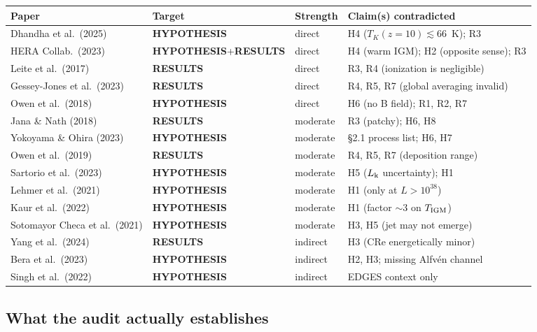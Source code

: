 \documentclass[11pt,a4paper]{article}
\newcommand{\HYP}{\textcolor{blue!60!black}{\textbf{HYPOTHESIS}}}
\newcommand{\RES}{\textcolor{red!60!black}{\textbf{RESULTS}}}
\begin{document}
\begin{longtable}{@{}p{4.6cm}p{1.9cm}p{2.0cm}p{5.6cm}@{}}
\toprule
\textbf{Paper} & \textbf{Target} & \textbf{Strength} & \textbf{Claim(s) contradicted} \\
\midrule
\endhead
Dhandha et al.\ (2025)        & \HYP{}        & direct   & H4 ($T_K(z{=}10)\lesssim66$~K); R3 \\
HERA Collab.\ (2023)          & \HYP{}+\RES{} & direct   & H4 (warm IGM); H2 (opposite sense); R3 \\
Leite et al.\ (2017)          & \RES{}        & direct   & R3, R4 (ionization is negligible) \\
Gessey-Jones et al.\ (2023)   & \RES{}        & direct   & R4, R5, R7 (global averaging invalid) \\
Owen et al.\ (2018)           & \HYP{}        & direct   & H6 (no B field); R1, R2, R7 \\
Jana \& Nath (2018)           & \RES{}        & moderate & R3 (patchy); H6, H8 \\
Yokoyama \& Ohira (2023)      & \HYP{}        & moderate & \S2.1 process list; H6, H7 \\
Owen et al.\ (2019)           & \RES{}        & moderate & R4, R5, R7 (deposition range) \\
Sartorio et al.\ (2023)       & \HYP{}        & moderate & H5 ($L_{\rm k}$ uncertainty); H1 \\
Lehmer et al.\ (2021)         & \HYP{}        & moderate & H1 (only at $L>10^{38}$) \\
Kaur et al.\ (2022)           & \HYP{}        & moderate & H1 (factor $\sim3$ on $T_{\rm IGM}$) \\
Sotomayor Checa et al.\ (2021)& \HYP{}        & moderate & H3, H5 (jet may not emerge) \\
Yang et al.\ (2024)           & \RES{}        & indirect & H3 (CRe energetically minor) \\
Bera et al.\ (2023)           & \HYP{}        & indirect & H2, H3; missing Alfv\'en channel \\
Singh et al.\ (2022)          & \HYP{}        & indirect & EDGES context only \\
\bottomrule
\end{longtable}

\subsection{What the audit actually establishes}
\end{document}
